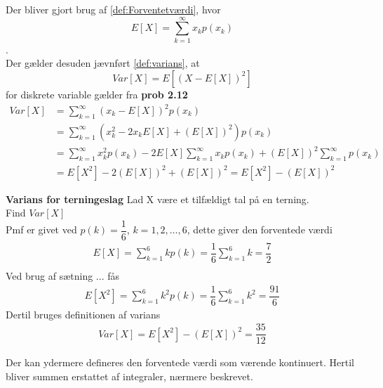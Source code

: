 \begin{bev} \textbf{} %
\newline
Der bliver gjort brug af \autoref{def:Forventetværdi}, hvor\\
$$E[X] = \sum_{k=1}^\infty x_k p(x_k)$$.\\
Der gælder desuden jævnført \autoref{def:varians}, at\\
$$Var[X] = E[(X-E[X])^2]$$
for diskrete variable gælder fra \textbf{prob 2.12}
\begin{align*}
    Var[X] &=\sum_{k=1}^\infty(x_k-E[X])^2 p(x_k)\\
    &= \sum_{k=1}^\infty (x_k^2-2x_kE[X]+(E[X])^2)p(x_k)\\
    &= \sum_{k=1}^\infty x_k^2p(x_k) - 2E[X] \sum_{k=1}^\infty x_k p(x_k) + (E[X])^2 \sum_{k=1}^\infty p(x_k)\\
    &= E[X^2]-2(E[X])^2+(E[X])^2
    = E[X^2] - (E[X])^2
\end{align*}
\end{bev}


\begin{eks} \textbf{Varians for terningeslag} %
\newline
Lad X være et tilfældigt tal på en terning.\\
Find $Var[X]$\\
Pmf er givet ved $p(k) = \dfrac{1}{6}$, $k=1,2,\ldots, 6$, dette giver den forventede værdi\\
\begin{align*}
    E[X]=\sum_{k=1}^6 kp(k) = \dfrac{1}{6}\sum_{k=1}^6 k=\dfrac{7}{2}\\
\end{align*}
Ved brug af sætning ... fås\\
    
\begin{align*}
    E[X^2]=\sum_{k=1}^6 k^2 p(k) = \dfrac{1}{6} \sum_{k=1}^6 k^2 = \dfrac{91}{6}
\end{align*}
Dertil bruges definitionen af varians\\
\begin{align*}
    Var[X]=E[X^2]-(E[X])^2=\dfrac{35}{12}
\end{align*}
\end{eks}











\iffalse
Der kan ydermere defineres den forventede værdi som værende kontinuert. Hertil bliver summen erstattet af integraler, nærmere beskrevet.

